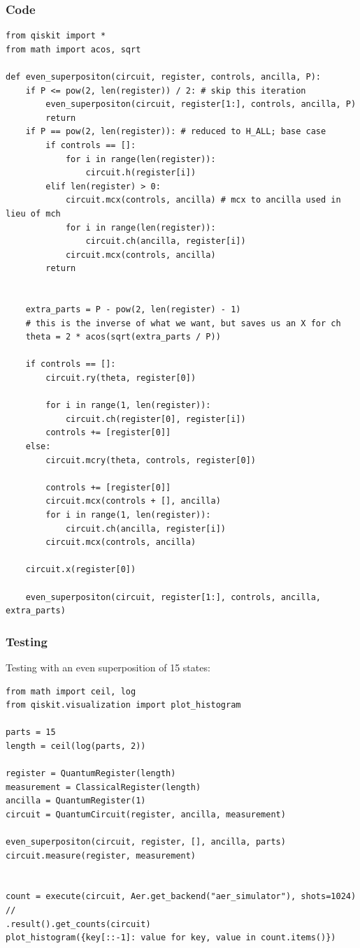 \documentclass[12pt]{article}
\begin{document}
\subsubsection{Code}
\begin{verbatim}
from qiskit import *
from math import acos, sqrt

def even_superpositon(circuit, register, controls, ancilla, P):
    if P <= pow(2, len(register)) / 2: # skip this iteration
        even_superpositon(circuit, register[1:], controls, ancilla, P)
        return
    if P == pow(2, len(register)): # reduced to H_ALL; base case
        if controls == []:
            for i in range(len(register)):
                circuit.h(register[i])
        elif len(register) > 0:
            circuit.mcx(controls, ancilla) # mcx to ancilla used in lieu of mch
            for i in range(len(register)):
                circuit.ch(ancilla, register[i])
            circuit.mcx(controls, ancilla)
        return


    extra_parts = P - pow(2, len(register) - 1)
    # this is the inverse of what we want, but saves us an X for ch
    theta = 2 * acos(sqrt(extra_parts / P))

    if controls == []:
        circuit.ry(theta, register[0])

        for i in range(1, len(register)):
            circuit.ch(register[0], register[i])
        controls += [register[0]]
    else:
        circuit.mcry(theta, controls, register[0])

        controls += [register[0]]
        circuit.mcx(controls + [], ancilla)
        for i in range(1, len(register)):
            circuit.ch(ancilla, register[i])
        circuit.mcx(controls, ancilla)

    circuit.x(register[0])

    even_superpositon(circuit, register[1:], controls, ancilla, extra_parts)
\end{verbatim}
\label{qrng}
\subsubsection{Testing}
Testing with an even superposition of 15 states:

\begin{verbatim}
from math import ceil, log
from qiskit.visualization import plot_histogram

parts = 15
length = ceil(log(parts, 2))

register = QuantumRegister(length)
measurement = ClassicalRegister(length)
ancilla = QuantumRegister(1)
circuit = QuantumCircuit(register, ancilla, measurement)

even_superpositon(circuit, register, [], ancilla, parts)
circuit.measure(register, measurement)


count = execute(circuit, Aer.get_backend("aer_simulator"), shots=1024) //
.result().get_counts(circuit)
plot_histogram({key[::-1]: value for key, value in count.items()})
\end{verbatim}
\end{document}
